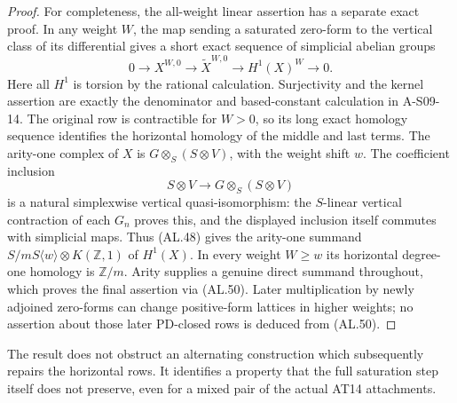 \begin{proof}
For completeness, the all-weight linear assertion
has a separate exact proof.  In any weight $W$, the
map sending a saturated zero-form to the vertical
class of its differential gives a short exact
sequence of simplicial abelian groups
\[
 0\longrightarrow X^{W,0}\longrightarrow
 \widetilde X^{W,0}\longrightarrow H^1(X)^W
 \longrightarrow0.
 \tag{AL.50}
\]
Here all $H^1$ is torsion by the rational calculation.
Surjectivity and the kernel assertion are exactly
the denominator and based-constant calculation in
A-S09-14.  The original row is contractible for
$W>0$, so its long exact homology sequence identifies
the horizontal homology of the middle and last terms.
The arity-one complex of $X$ is $G\otimes_S(S\otimes V)$,
with the weight shift $w$.  The coefficient inclusion
\[
 S\otimes V\longrightarrow G\otimes_S(S\otimes V)
\]
is a natural simplexwise vertical quasi-isomorphism:
the $S$-linear vertical contraction of each $G_n$
proves this, and the displayed inclusion itself
commutes with simplicial maps.
Thus \textup{(AL.48)} gives the arity-one summand
$S/mS\langle w\rangle\otimes K(\mathbb Z,1)$
of $H^1(X)$.
In every weight $W\geq w$ its horizontal degree-one
homology is $\mathbb Z/m$.
Arity supplies a genuine direct summand throughout,
which proves the final assertion via \textup{(AL.50)}.
Later multiplication by newly adjoined zero-forms can
change positive-form lattices in higher weights;
no assertion about those later PD-closed rows is
deduced from \textup{(AL.50)}.
\end{proof}

The result does not obstruct an alternating construction
which subsequently repairs the horizontal rows.
It identifies a property that the full saturation step
itself does not preserve, even for a mixed pair of the
actual AT14 attachments.
